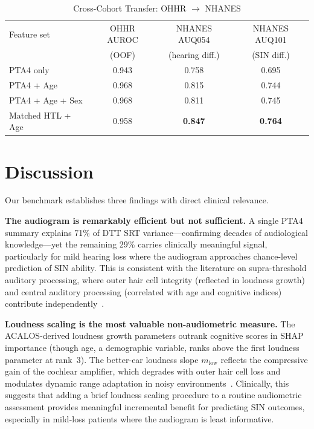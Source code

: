 \documentclass[conference]{IEEEtran}
\begin{document}
\begin{table}[h]
\caption{Cross-Cohort Transfer: OHHR $\to$ NHANES}
\label{tab:crosscohort}
\centering\small
\begin{tabular}{lccc}
\toprule
Feature set & OHHR AUROC & NHANES AUQ054 & NHANES AUQ101 \\
            & (OOF)      & (hearing diff.) & (SIN diff.) \\
\midrule
PTA4 only              & 0.943 & 0.758 & 0.695 \\
PTA4 + Age             & 0.968 & 0.815 & 0.744 \\
PTA4 + Age + Sex       & 0.968 & 0.811 & 0.745 \\
Matched HTL + Age      & 0.958 & \textbf{0.847} & \textbf{0.764} \\
\bottomrule
\end{tabular}
\end{table}

\section{Discussion}

Our benchmark establishes three findings with direct clinical relevance.

\textbf{The audiogram is remarkably efficient but not sufficient.} A single
PTA4 summary explains 71\% of DTT SRT variance---confirming decades of
audiological knowledge---yet the remaining 29\% carries clinically
meaningful signal, particularly for mild hearing loss where the audiogram
approaches chance-level prediction of SIN ability.  This is consistent with
the literature on supra-threshold auditory processing, where outer hair cell
integrity (reflected in loudness growth) and central auditory processing
(correlated with age and cognitive indices) contribute
independently~\cite{Moore2001DeadRegions}.

\textbf{Loudness scaling is the most valuable non-audiometric measure.}
The ACALOS-derived loudness growth parameters outrank cognitive scores in
SHAP importance (though age, a demographic variable, ranks above the first
loudness parameter at rank~3).  The better-ear loudness slope $m_\text{low}$
reflects the compressive gain of the cochlear amplifier, which degrades with
outer hair cell loss and modulates dynamic range adaptation in noisy
environments~\cite{Brand2002}.  Clinically, this suggests that
adding a brief loudness scaling procedure to a routine audiometric assessment
provides meaningful incremental benefit for predicting SIN outcomes, especially
in mild-loss patients where the audiogram is least informative.
\end{document}
